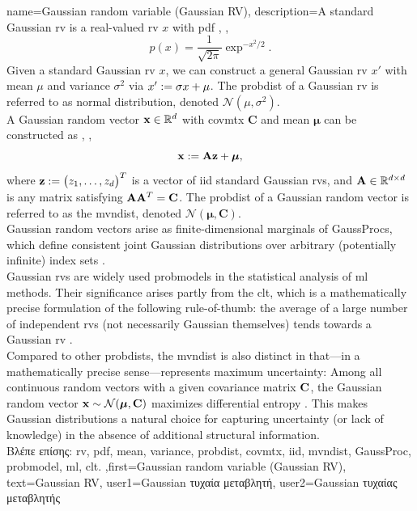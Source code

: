 {name={Gaussian random variable (Gaussian RV)},
	description={A  standard Gaussian \gls{rv} is a 
		real-valued \gls{rv} $x$ with \gls{pdf} \cite{BertsekasProb}, \cite{GrayProbBook}, \cite{papoulis}
		\begin{equation}
			\nonumber
			p(x) = \frac{1}{\sqrt{2\pi}} \exp^{-x^2/2}. 
		\end{equation}
		Given a standard Gaussian \gls{rv} $x$, we can construct a general Gaussian \gls{rv} $x'$ with 
		\gls{mean} $\mu$ and \gls{variance} $\sigma^2$ via $x' := \sigma x + \mu$. The \gls{probdist} of a 
		Gaussian \gls{rv} is referred to as normal distribution, denoted $\mathcal{N}(\mu, \sigma^2)$. 
		\\ 
		A Gaussian random vector ${\bf x} \in \mathbb{R}^{d}$ with 
		\gls{covmtx} $\mathbf{C}$ and \gls{mean} ${\bm \mu}$ can be constructed as \cite{GrayProbBook}, \cite{papoulis}, \cite{Lapidoth09}
		\[
		{\bf x} := \mathbf{A} {\bf z} + {\bm \mu},
		\]
		where ${\bf z} := \big( z_{1}, \ldots, z_{d} \big)^{T}$ is a vector of \gls{iid} standard Gaussian \gls{rv}s, 
		and ${\bf A} \in \mathbb{R}^{d \times d}$ is any matrix satisfying ${\bf A} {\bf A}^{T} = {\bf C}$. 
		The \gls{probdist} of a 
		Gaussian random vector is referred to as the \gls{mvndist}, denoted $\mathcal{N}({\bm \mu}, \mathbf{C})$.
		\\
		Gaussian random vectors arise as finite-dimensional marginals of \gls{GaussProc}s, which define 
		consistent joint Gaussian distributions over arbitrary (potentially infinite) index sets \cite{Rasmussen2006Gaussian}. 
  		\\
        		Gaussian \gls{rv}s are widely used \gls{probmodel}s in the statistical analysis of 
        		\gls{ml} methods. Their significance arises partly from the \gls{clt}, which is a mathematically 
        		precise formulation of the following rule-of-thumb: the average of a large number of 
        		independent \gls{rv}s (not necessarily Gaussian themselves) tends towards a Gaussian \gls{rv} \cite{ross2013first}.
		\\ 
		Compared to other \gls{probdist}s, the \gls{mvndist} is also distinct in that—in a mathematically 
		precise sense—represents maximum uncertainty: Among all continuous random vectors with 
		a given covariance matrix ${\bf C}$, the Gaussian random vector ${\bf x} \sim \mathcal{N}({\bm \mu}, \mathbf{C})$ 
		maximizes differential entropy \cite[Th. 8.6.5]{coverthomas}. This makes Gaussian distributions a 
		natural choice for capturing uncertainty (or lack of knowledge) in the absence of additional 
		structural information.
		\\
		\foreignlanguage{greek}{Βλέπε επίσης:} \gls{rv}, \gls{pdf}, \gls{mean}, \gls{variance}, \gls{probdist}, \gls{covmtx}, \gls{iid}, \gls{mvndist}, \gls{GaussProc}, \gls{probmodel}, \gls{ml}, \gls{clt}.
},first={Gaussian random variable (Gaussian RV)},
text={Gaussian RV},
user1={Gaussian \foreignlanguage{greek}{τυχαία μεταβλητή}}, %
user2={Gaussian \foreignlanguage{greek}{τυχαίας μεταβλητής}} %
}

